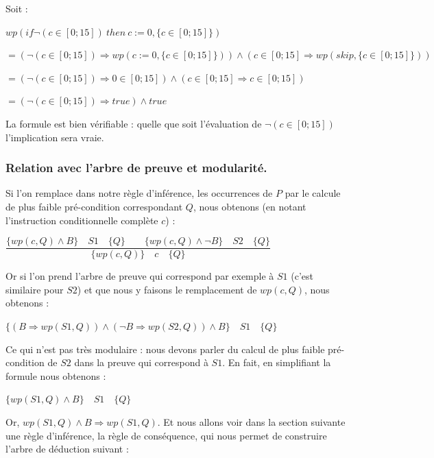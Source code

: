 \documentclass[12pt,francais,]{scrbook}
\begin{document}
Soit :

\(wp(if \neg (c \in [0;15])\ then\ c := 0, \{c \in [0;15]\})\)

\(= (\neg (c \in [0;15])\Rightarrow wp(c := 0, \{c \in [0;15]\})) \wedge (c \in [0;15]\Rightarrow wp(skip, \{c \in [0;15]\}))\)

\(= (\neg (c \in [0;15]) \Rightarrow 0 \in [0;15]) \wedge (c \in [0;15] \Rightarrow c \in [0;15])\)

\(= (\neg (c \in [0;15]) \Rightarrow true) \wedge true\)

La formule est bien vérifiable : quelle que soit l'évaluation de
\(\neg (c \in [0;15])\) l'implication sera vraie.

\subsubsection{Relation avec l'arbre de preuve et
modularité.}\label{relation-avec-larbre-de-preuve-et-modularituxe9.}

Si l'on remplace dans notre règle d'inférence, les occurrences de \(P\)
par le calcule de plus faible pré-condition correspondant \(Q\), nous
obtenons (en notant l'instruction conditionnelle complète \(c\)) :

\begin{center}
\(\dfrac{\{wp(c,Q) \wedge B\}\quad S1\quad \{Q\} \quad \quad \{wp(c,Q) \wedge \neg B\}\quad S2\quad \{Q\}}{\{wp(c,Q)\}\quad c\quad \{Q\}}\)\end{center}

Or si l'on prend l'arbre de preuve qui correspond par exemple à \(S1\)
(c'est similaire pour \(S2\)) et que nous y faisons le remplacement de
\(wp(c,Q)\), nous obtenons :

\begin{center}
\(\{ (B \Rightarrow wp(S1,Q)) \wedge (\neg B \Rightarrow wp(S2,Q)) \wedge B \} \quad S1 \quad \{Q\}\)
\end{center}

Ce qui n'est pas très modulaire : nous devons parler du calcul de plus
faible pré-condition de \(S2\) dans la preuve qui correspond à \(S1\).
En fait, en simplifiant la formule nous obtenons :

\begin{center} \(\{ wp(S1,Q) \wedge B \} \quad S1 \quad \{Q\}\)
\end{center}

Or, \(wp(S1,Q) \wedge B \Rightarrow wp(S1,Q)\). Et nous allons voir dans
la section suivante une règle d'inférence, la règle de conséquence, qui
nous permet de construire l'arbre de déduction suivant :
\end{document}
